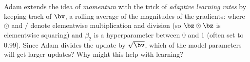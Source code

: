 \begin{parts}
\begin{subparts}
                
            \subpart[2] Adam extends the idea of {\it momentum} with the trick of {\it adaptive learning rates} by keeping track of  $\bv$, a rolling average of the magnitudes of the gradients:
                where $\odot$ and $/$ denote elementwise multiplication and division (so $\bz \odot \bz$ is elementwise squaring) and $\beta_2$ is a hyperparameter between 0 and 1 (often set to  0.99). Since Adam divides the update by $\sqrt{\bv}$, which of the model parameters will get larger updates?  Why might this help with learning?
                
           
                
                \end{subparts}
        
        

\end{parts}
